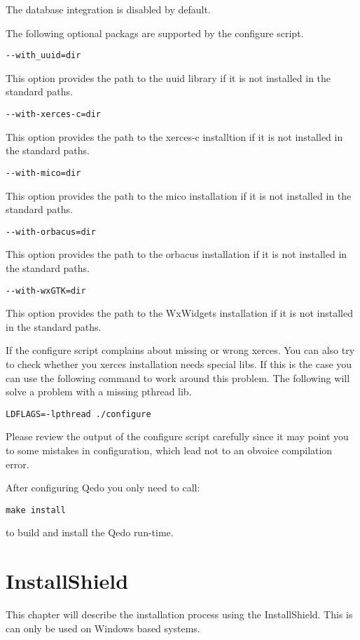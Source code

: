 \documentclass[12pt,a4paper]{report}
\begin{document}
The database integration is disabled by default.


The following optional packags are supported by the configure script.

\begin{verbatim}
--with_uuid=dir
\end{verbatim}

This option provides the path to the uuid library if it is not installed in the standard paths.

\begin{verbatim}
--with-xerces-c=dir
\end{verbatim}

This option provides the path to the xerces-c installtion if it is not installed in the standard paths.

\begin{verbatim}
--with-mico=dir
\end{verbatim}

This option provides the path to the mico installation if it is not installed in the standard paths.

\begin{verbatim}
--with-orbacus=dir
\end{verbatim}

This option provides the path to the orbacus installation if it is not installed in the standard paths.

\begin{verbatim}
--with-wxGTK=dir
\end{verbatim}

This option provides the path to the WxWidgets installation if it is not installed in the standard paths.

If the configure script complains about missing or wrong xerces. You can also try to check whether you xerces installation needs special libs. If this is the case you can use the following command to work around this problem. The following will solve a problem with a missing pthread lib.

\begin{verbatim}
LDFLAGS=-lpthread ./configure
\end{verbatim}

Please review the output of the configure script carefully since it may point you to some mistakes in configuration, which lead not to an obvoice compilation error.

After configuring Qedo you only need to call:
\begin{verbatim}
make install
\end{verbatim}

to build and install the Qedo run-time.

\chapter{InstallShield}
\label{sec:InstallShield}
This chapter will describe the installation process using the InstallShield. This is can only be used on Windows based systems.
\end{document}
